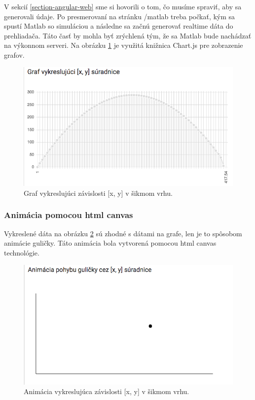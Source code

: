 V sekcií \ref{section-angular-web} sme si hovorili o tom, čo musíme spraviť, aby sa generovali údaje. Po presmerovaní na stránku /matlab treba počkať, kým sa spustí Matlab so simuláciou a následne sa začnú generovať realtime dáta do prehliadača. Táto časť by mohla byť zrýchlená tým, že sa Matlab bude nachádzať na výkonnom serveri. Na obrázku \ref{img-angular-chartjs} je využitá knižnica Chart.js pre zobrazenie grafov.

\begin{figure}[H]
  \centering
  \includegraphics[scale=0.5]{img/code/angular-chartjs.png}
  \caption{Graf vykreslujúci závislosti [x, y] v šikmom vrhu.}
  \label{img-angular-chartjs}
\end{figure}

\subsubsection{Animácia pomocou html canvas}\label{section-canvas}
Vykreslené dáta na obrázku \ref{img-angular-canvas} sú zhodné s dátami na grafe, len je to spôsobom animácie guličky. Táto animácia bola vytvorená pomocou html canvas technológie.

\begin{figure}[H]
  \centering
  \includegraphics[scale=0.5]{img/code/angular-canvas.png}
  \caption{Animácia vykreslujúca závislosti [x, y] v šikmom vrhu.}
  \label{img-angular-canvas}
\end{figure}

